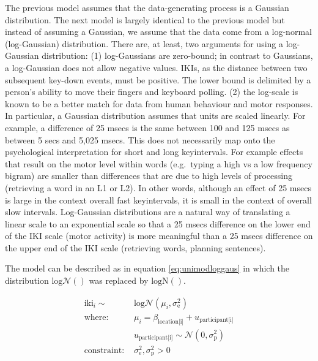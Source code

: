 \documentclass[
  man,floatsintext]{apa7}
\begin{document}
The previous model assumes that the data-generating process is a Gaussian distribution. The next model is largely identical to the previous model but instead of assuming a Gaussian, we assume that the data come from a log-normal (log-Gaussian) distribution. There are, at least, two arguments for using a log-Gaussian distribution: (1) log-Gaussians are zero-bound; in contrast to Gaussians, a log-Gaussian does not allow negative values. IKIs, as the distance between two subsequent key-down events, must be positive. The lower bound is delimited by a person's ability to move their fingers and keyboard polling. (2) the log-scale is known to be a better match for data from human behaviour and motor responses. In particular, a Gaussian distribution assumes that units are scaled linearly. For example, a difference of 25 msecs is the same between 100 and 125 msecs as between 5 secs and 5,025 msecs. This does not necessarily map onto the psychological interpretation for short and long keyintervals. For example effects that result on the motor level within words (e.g.~typing a high vs a low frequency bigram) are smaller than differences that are due to high levels of processing (retrieving a word in an L1 or L2). In other words, although an effect of 25 msecs is large in the context overall fast keyintervals, it is small in the context of overall slow intervals. Log-Gaussian distributions are a natural way of translating a linear scale to an exponential scale so that a 25 msecs difference on the lower end of the IKI scale (motor activity) is more meaningful than a 25 msecs difference on the upper end of the IKI scale (retrieving words, planning sentences).

The model can be described as in equation \ref{eq:unimodloggaus} in which the distribution \(\text{log}\mathcal{N}()\) was replaced by \(\text{logN}()\).

\begin{equation}
\begin{aligned}
\label{eq:unimodloggaus}
\text{iki}_i \sim\text{ } & \text{log}\mathcal{N}(\mu_i, \sigma_\text{e}^2) \\
\text{where: } &
\mu_i = \beta_\text{location[i]} + u_\text{participant[i]}\\
& u_\text{participant[i]} \sim \mathcal{N}(0, \sigma_\text{p}^2) \\
\text{constraint: } & \sigma_\text{e}^2, \sigma_\text{p}^2>0
\end{aligned}
\end{equation}
\end{document}
